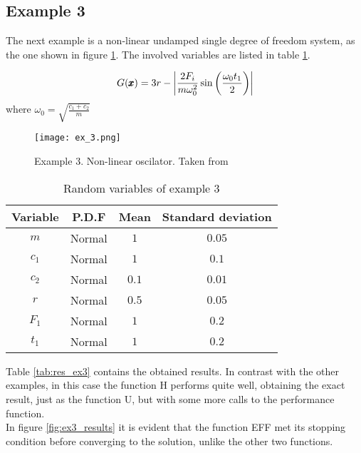 \newpage
\subsection{Example 3}
The next example is a non-linear undamped single degree of freedom system, as the
one shown in figure \ref{fig:ex3}. The involved variables are listed in table \ref{tab:var_ex3}.

\begin{equation}
  G(\pmb{x}) = 3r - \left\lvert\frac{2F_i}{m\omega_0^2} \sin{\left( \frac{\omega_0 t_1}{2} \right)} \right\rvert
\end{equation}
where $\omega_0 = \sqrt{\frac{c_1 + c_2}{m}}$

\begin{figure}[h]
    \texttt{[image: ex\_3.png]}
    \caption{Example 3. Non-linear oscilator. Taken from \citep{Schu2005}}
    \label{fig:ex3}
\end{figure}

\begin{table}[h]
    \footnotesize%
    \begin{center}
    \begin{tabular}{cccc}
    \toprule
    Variable & P.D.F & Mean & Standard deviation \\
    \midrule
    $m$   & Normal & $1$ & $0.05$ \\
    $c_1$   & Normal & $1$ & $0.1$ \\
    $c_2$   & Normal & $0.1$ & $0.01$ \\
    $r$   & Normal & $0.5$ & $0.05$ \\
    $F_1$   & Normal & $1$ & $0.2$ \\
    $t_1$   & Normal & $1$ & $0.2$ \\
    \bottomrule
    \end{tabular}
    \end{center}
    \caption{Random variables of example 3}
    \label{tab:var_ex3}
\end{table}

Table \ref{tab:res_ex3} contains the obtained results. In contrast with the other
examples, in this case the function H performs quite well, obtaining the exact result, just
as the function U, but with some more calls to the performance function. \\

In figure \ref{fig:ex3_results} it is evident that the function EFF met its stopping
condition before converging to the solution, unlike the other two functions.

